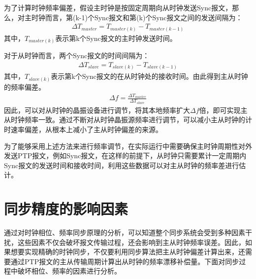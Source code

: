为了计算时钟频率偏差，假设主时钟是按固定周期向从时钟发送Sync报文，那么，对主时钟而言，第(k-1)个Sync报文和第(k)个Sync报文之间的发送间隔\supercite{6}为：
\begin{align}
	\Delta T_{master} = T_{master(k)} - T_{master(k - 1)}
\end{align}
其中，$T_{master(k)}$表示第k个Sync报文的主时钟发送时间。

对于从时钟而言，两个Sync报文的时间间隔\supercite{6}为：
\begin{align}
	\Delta T_{slave} = T_{slave(k)} - T_{slave(k - 1)}
\end{align}
其中，$T_{slave(k)}$表示第k个Sync报文的在从时钟处的接收时间。由此得到主从时钟的频率偏差。
\begin{align}
	\Delta f = \frac{\Delta T_{master}}{\Delta T_{slave}}
\end{align}
因此，可以对从时钟的晶振设备进行调节，将其本地频率扩大$\Delta f$倍，即可实现主从时钟频率一致。通过不断对从时钟晶振源频率进行调节，可以减小主从时钟的计时速率偏差，从根本上减小了主从时钟偏差的来源。

为了能够采用上述方法来进行频率调节，在实际运行中需要确保主时钟周期性对外发送PTP报文，例如Sync报文，在这样的前提下，从时钟只需要累计一定周期内Sync报文的发送时间和接收时间，利用这些数据可以对主从时钟的频率差进行估计。

\section{同步精度的影响因素}
通过对时钟相位、频率同步原理的分析，可以知道整个同步系统会受到多种因素干扰，这些因素不仅会破坏报文传输过程，还会影响到主从时钟频率误差。因此，如果想要实现精确的时钟同步，不仅要利用同步算法把主从时钟偏差计算出来，还需要通过PTP报文的主从传输周期计算出从时钟的频率漂移补偿量。下面对同步过程中破坏相位、频率的因素进行分析。


